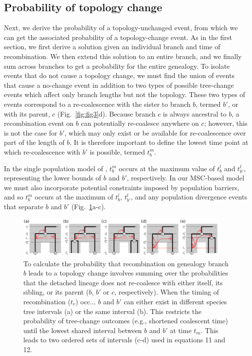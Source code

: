 \documentclass[11pt]{article}
\begin{document}
\subsection{Probability of topology change}
Next, we derive the probability of a topology-unchanged event, from which
we can get the associated probability of a topology-change event. 
As in the first section, we first derive a solution given an individual 
branch and time of recombination. We then extend this solution to an entire branch, and we 
finally sum across branches to get a probability for the entire genealogy. 
To isolate events that do not cause a topology change, we must find
the union of events that cause a no-change event in addition to two types of 
possible tree-change events which affect only branch lengths but not the 
topology. These two types of events correspond to a re-coalescence with the 
sister to branch $b$, termed $b'$, or with its parent, $c$ (Fig.~\ref{fig:fig3}d).
Because branch $c$ is always ancestral to $b$, a recombination
event on $b$ can potentially re-coalesce anywhere on $c$; however, 
this is not the case for $b'$, which may only exist or be available for 
re-coalescence over part of the length of $b$. It is therefore important 
to define the lowest time point at which re-coalescence with $b'$ is 
possible, termed $t_b^m$. 

In the single population model of \citet{deng_distribution_2021}, 
$t_b^m$ occurs at the maximum value of $t_b^l$ and $t_{b'}^l$, 
representing the lower bounds of $b$ and $b'$, respectively. 
In our MSC-based model we must also incorporate potential 
constraints imposed by population barriers, and so $t_b^m$ occurs at 
the maximum of $t_b^l$, $t_{b'}^l$, and any population divergence 
events that separate $b$ and $b'$ (Fig.~\ref{fig:figS-tbm}a-c).


\begin{figure}[t]
	\centering
	\includegraphics[width=0.95\textwidth]{figures/FigS-tbm.pdf}
	\caption{
		To calculate the probability that recombination on genealogy branch 
		$b$ leads to a topology change involves summing over the probabilities 
		that the detached lineage does not re-coalesce with either
		itself, its sibling, or its parent ($b$, $b'$ or $c$, respectively). 
		When the timing of recombination ($t_r$) occ...
		$b$ and $b'$ can either exist 
		in different species tree intervals (a) or the same interval (b). This 
		restricts the probability of tree-change outcomes (e.g., shortened coalescent 
		time) until the lowest shared interval between $b$ and $b'$ at time 
		$t_m$. This leads to two ordered sets of intervals (c-d) used in 
		equations 11 and 12.
	}
	\label{fig:figS-tbm}
\end{figure}
\end{document}
